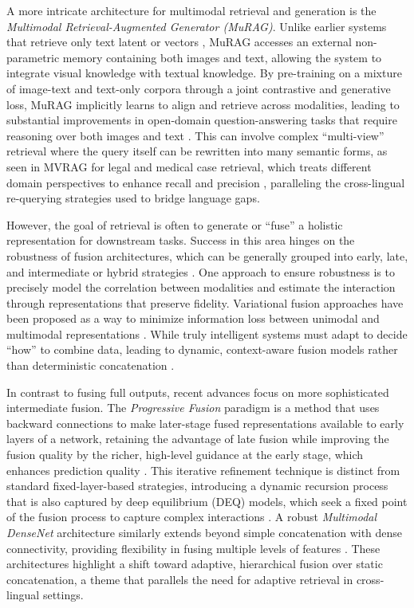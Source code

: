 \documentclass[11pt]{article}
\begin{document}
A more intricate architecture for multimodal retrieval and generation is the \emph{Multimodal Retrieval-Augmented Generator (MuRAG)}. Unlike earlier systems that retrieve only text latent or vectors \cite{ref356}, MuRAG accesses an external non-parametric memory containing both images and text, allowing the system to integrate visual knowledge with textual knowledge. By pre-training on a mixture of image-text and text-only corpora through a joint contrastive and generative loss, MuRAG implicitly learns to align and retrieve across modalities, leading to substantial improvements in open-domain question-answering tasks that require reasoning over both images and text \cite{ref357}. This can involve complex ``multi-view'' retrieval where the query itself can be rewritten into many semantic forms, as seen in MVRAG for legal and medical case retrieval, which treats different domain perspectives to enhance recall and precision \cite{ref358}, paralleling the cross-lingual re-querying strategies used to bridge language gaps.

However, the goal of retrieval is often to generate or ``fuse'' a holistic representation for downstream tasks. Success in this area hinges on the robustness of fusion architectures, which can be generally grouped into early, late, and intermediate or hybrid strategies \cite{ref359}. One approach to ensure robustness is to precisely model the correlation between modalities and estimate the interaction through representations that preserve fidelity. Variational fusion approaches have been proposed as a way to minimize information loss between unimodal and multimodal representations \cite{ref360}. While truly intelligent systems must adapt to decide ``how'' to combine data, leading to dynamic, context-aware fusion models rather than deterministic concatenation \cite{ref361}.

In contrast to fusing full outputs, recent advances focus on more sophisticated intermediate fusion. The \emph{Progressive Fusion} paradigm is a method that uses backward connections to make later-stage fused representations available to early layers of a network, retaining the advantage of late fusion while improving the fusion quality by the richer, high-level guidance at the early stage, which enhances prediction quality \cite{ref362}. This iterative refinement technique is distinct from standard fixed-layer-based strategies, introducing a dynamic recursion process that is also captured by deep equilibrium (DEQ) models, which seek a fixed point of the fusion process to capture complex interactions \cite{ref363}. A robust \emph{Multimodal DenseNet} architecture similarly extends beyond simple concatenation with dense connectivity, providing flexibility in fusing multiple levels of features \cite{ref364}. These architectures highlight a shift toward adaptive, hierarchical fusion over static concatenation, a theme that parallels the need for adaptive retrieval in cross-lingual settings.
\end{document}
